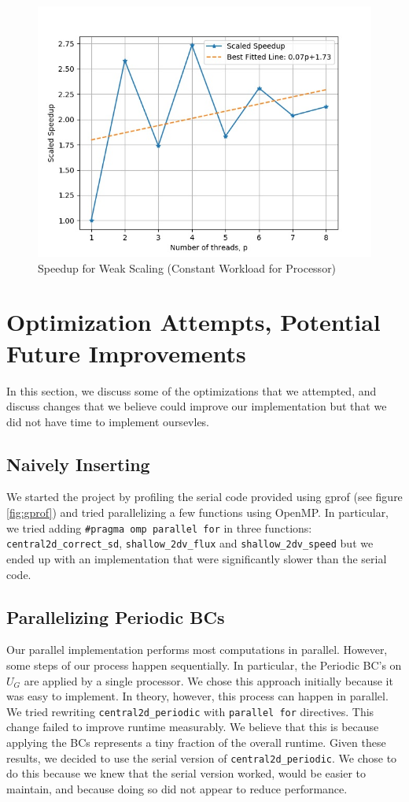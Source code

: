 \documentclass{article}
\begin{document}
\begin{figure}[h!]
	\centering
	\includegraphics[width=0.8\columnwidth]{../weak_scaling_v2.jpg}
	\caption{Speedup for Weak Scaling (Constant Workload for Processor)}
	\label{fig:weak_scaling_v2}
\end{figure}

\section{Optimization Attempts, Potential Future Improvements}
In this section, we discuss some of the optimizations that we attempted, and discuss changes that we believe could improve our implementation but that we did not have time to implement oursevles.

\subsection{Naively Inserting }

We started the project by profiling the serial code provided using gprof (see figure \ref{fig:gprof}) and tried parallelizing a few functions using OpenMP.
In particular, we tried adding \texttt{\#pragma omp parallel for} in three functions: \texttt{central2d\_correct\_sd}, \texttt{shallow\_2dv\_flux} and \texttt{shallow\_2dv\_speed}
but we ended up with an implementation that were significantly slower than the serial code.

\subsection{Parallelizing Periodic BCs}
Our parallel implementation performs most computations in parallel.
However, some steps of our process happen sequentially.
In particular, the Periodic BC's on $U_G$ are applied by a single processor.
We chose this approach initially because it was easy to implement.
In theory, however, this process can happen in parallel.
We tried rewriting \texttt{central2d\_periodic}
with \texttt{parallel for} directives.
This change failed to improve runtime measurably.
We believe that this is because applying the BCs represents a tiny fraction of the overall runtime.
Given these results, we decided to use the serial version of \texttt{central2d\_periodic}.
We chose to do this because we knew that the serial version worked,  would be easier to maintain, and because doing so did not appear to reduce performance.
\end{document}
